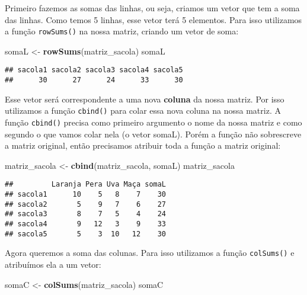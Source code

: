 \documentclass[]{book}
\newenvironment{Shaded}{\begin{snugshade}}{\end{snugshade}}
\newcommand{\KeywordTok}[1]{\textcolor[rgb]{0.13,0.29,0.53}{\textbf{#1}}}
\newcommand{\NormalTok}[1]{#1}
\newcommand{\StringTok}[1]{\textcolor[rgb]{0.31,0.60,0.02}{#1}}
\theoremstyle{definition}
\theoremstyle{definition}
\theoremstyle{definition}
\theoremstyle{remark}
\begin{document}
Primeiro fazemos as somas das linhas, ou seja, criamos um vetor que tem a soma das linhas. Como temos 5 linhas, esse vetor terá 5 elementos. Para isso utilizamos a função \texttt{rowSums()} na nossa matriz, criando um vetor de soma:

\begin{Shaded}
\begin{Highlighting}[]
\NormalTok{somaL <-}\StringTok{ }\KeywordTok{rowSums}\NormalTok{(matriz_sacola)}
\NormalTok{somaL}
\end{Highlighting}
\end{Shaded}

\begin{verbatim}
## sacola1 sacola2 sacola3 sacola4 sacola5 
##      30      27      24      33      30
\end{verbatim}

Esse vetor será correspondente a uma nova \textbf{coluna} da nossa matriz. Por isso utilizamos a função \texttt{cbind()} para colar essa nova coluna na nossa matriz. A função \texttt{cbind()} precisa como primeiro argumento o nome da nossa matriz e como segundo o que vamos colar nela (o vetor somaL). Porém a função não sobrescreve a matriz original, então precisamos atribuir toda a função a matriz original:

\begin{Shaded}
\begin{Highlighting}[]
\NormalTok{matriz_sacola <-}\StringTok{ }\KeywordTok{cbind}\NormalTok{(matriz_sacola, somaL)}
\NormalTok{matriz_sacola}
\end{Highlighting}
\end{Shaded}

\begin{verbatim}
##         Laranja Pera Uva Maça somaL
## sacola1      10    5   8    7    30
## sacola2       5    9   7    6    27
## sacola3       8    7   5    4    24
## sacola4       9   12   3    9    33
## sacola5       5    3  10   12    30
\end{verbatim}

Agora queremos a soma das colunas. Para isso utilizamos a função \texttt{colSums()} e atribuímos ela a um vetor:

\begin{Shaded}
\begin{Highlighting}[]
\NormalTok{somaC <-}\StringTok{ }\KeywordTok{colSums}\NormalTok{(matriz_sacola)}
\NormalTok{somaC}
\end{Highlighting}
\end{Shaded}
\end{document}

